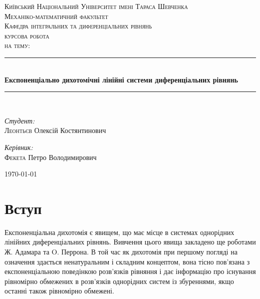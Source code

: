 \documentclass[14pt]{extarticle} %
\newcommand{\HRule}{\rule{\linewidth}{0.5mm}}
\begin{document}
\begin{titlepage}
	\addtolength{\voffset}{-3cm}
	\setlength{\footskip}{5.5cm}
	\thispagestyle{fancy}
	\begin{center}
		\textsc{\Large Київський Національний Університет імені Тараса Шевченка}\\[0.5cm]
		\textsc{\Large Механіко-математичний факультет}\\[0.5cm]
		\textsc{\Large Кафедра інтегральних та диференціальних рівнянь}\\[1.5cm]

		\textsc{\Large курсова робота}\\
		\textsc{\Large на тему:}\\[0.5cm]

		\HRule \\[0.4cm]
		{ \huge \bfseries Експоненціально дихотомічні лінійні системи диференціальних рівнянь}\\[0.4cm]

		\HRule \\[1.5cm]

		\begin{minipage}{0.4\textwidth}
			\begin{flushleft} \large
				\emph{Студент:}\\
				\textsc{Леонтьєв} Олексій Костянтинович
			\end{flushleft}
		\end{minipage}
		\begin{minipage}{0.4\textwidth}
			\begin{flushright} \large
				\emph{Керівник:} \\
				\textsc{Фекета} Петро Володимирович
			\end{flushright}
		\end{minipage}

		\vfill

		{\large \today}
	\end{center}
\end{titlepage}
\tableofcontents
\section*{Вступ}
Експоненціальна дихотомія є явищем, що має місце в системах однорідних лінійних диференціальних рівнянь. Вивчення цього явища
закладено ще роботами Ж. Адамара та O. Перрона. В той час як дихотомія при першому погляді на означення здається ненатуральним
і складним концептом, вона тісно пов’язана з експоненціальною поведінкою розв’язків рівняння і дає інформацію про існування рівномірно обмежених
в розв’язків однорідних систем із збуреннями, якщо останні також рівномірно обмежені.
\end{document}
